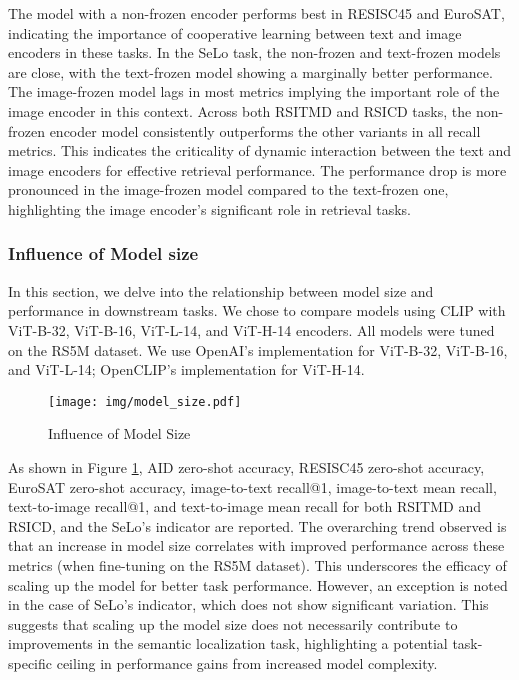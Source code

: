 \documentclass[journal]{IEEEtran}
\begin{document}
The model with a non-frozen encoder performs best in RESISC45 and EuroSAT, indicating the importance of cooperative learning between text and image encoders in these tasks. In the SeLo task, the non-frozen and text-frozen models are close, with the text-frozen model showing a marginally better performance.
The image-frozen model lags in most metrics implying the important role of the image encoder in this context. Across both RSITMD and RSICD tasks, the non-frozen encoder model consistently outperforms the other variants in all recall metrics. This indicates the criticality of dynamic interaction between the text and image encoders for effective retrieval performance. The performance drop is more pronounced in the image-frozen model compared to the text-frozen one, highlighting the image encoder's significant role in retrieval tasks.

\subsubsection{Influence of Model size}

In this section, we delve into the relationship between model size and performance in downstream tasks. We chose to compare models using CLIP with ViT-B-32, ViT-B-16, ViT-L-14, and ViT-H-14 encoders. All models were tuned on the RS5M dataset. We use OpenAI's implementation for ViT-B-32, ViT-B-16, and ViT-L-14; OpenCLIP's implementation for ViT-H-14.

\begin{figure}
    \centering
    \texttt{[image: img/model\_size.pdf]}
    \caption{Influence of Model Size}
    \label{fig:model_size}
\end{figure}

As shown in Figure \ref{fig:model_size}, AID zero-shot accuracy, RESISC45 zero-shot accuracy, EuroSAT zero-shot accuracy, image-to-text recall@1, image-to-text mean recall, text-to-image recall@1, and text-to-image mean recall for both RSITMD and RSICD, and the SeLo's  indicator are reported. 
The overarching trend observed is that an increase in model size correlates with improved performance across these metrics (when fine-tuning on the RS5M dataset). This underscores the efficacy of scaling up the model for better task performance. However, an exception is noted in the case of SeLo's  indicator, which does not show significant variation. This suggests that scaling up the model size does not necessarily contribute to improvements in the semantic localization task, highlighting a potential task-specific ceiling in performance gains from increased model complexity.
\end{document}
